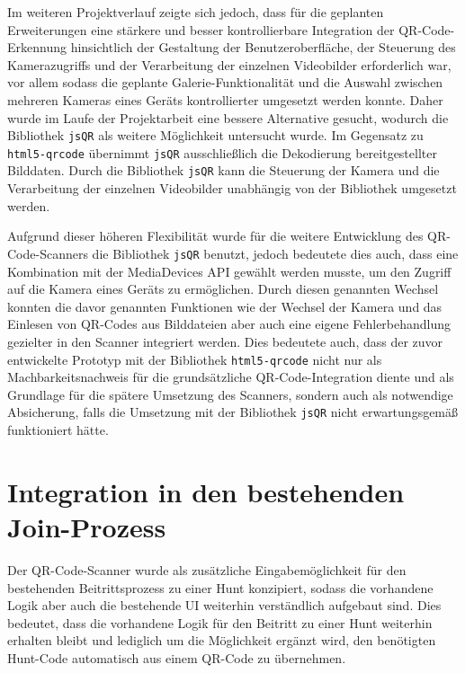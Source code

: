 ﻿\documentclass[oneside]{ausarbeitung}
\begin{document}
Im weiteren Projektverlauf zeigte sich jedoch, dass für die geplanten Erweiterungen eine stärkere und besser kontrollierbare Integration der
QR-Code-Erkennung hinsichtlich der Gestaltung der Benutzeroberfläche, der Steuerung des Kamerazugriffs und der Verarbeitung der einzelnen
Videobilder erforderlich war, vor allem sodass die geplante Galerie-Funktionalität und die Auswahl zwischen mehreren Kameras eines Geräts kontrollierter
umgesetzt werden konnte. Daher wurde im Laufe der Projektarbeit eine bessere Alternative gesucht, wodurch die Bibliothek \texttt{jsQR} als 
weitere Möglichkeit untersucht wurde. Im Gegensatz zu \texttt{html5-qrcode} übernimmt \texttt{jsQR} ausschließlich die Dekodierung bereitgestellter 
Bilddaten. Durch die Bibliothek \texttt{jsQR} kann die Steuerung der Kamera und die Verarbeitung der einzelnen Videobilder unabhängig von der
Bibliothek umgesetzt werden.

Aufgrund dieser höheren Flexibilität wurde für die weitere Entwicklung des QR-Code-Scanners die Bibliothek \texttt{jsQR} benutzt, jedoch bedeutete 
dies auch, dass eine Kombination mit der MediaDevices API gewählt werden musste, um den Zugriff auf die Kamera eines Geräts zu ermöglichen.
Durch diesen genannten Wechsel konnten die davor genannten Funktionen wie der Wechsel der Kamera und das Einlesen von QR-Codes aus Bilddateien 
aber auch eine eigene Fehlerbehandlung gezielter in den Scanner integriert werden. Dies bedeutete auch, dass der zuvor entwickelte Prototyp
mit der Bibliothek \texttt{html5-qrcode} nicht nur als Machbarkeitsnachweis für die grundsätzliche QR-Code-Integration diente und als Grundlage 
für die spätere Umsetzung des Scanners, sondern auch als notwendige Absicherung, falls die Umsetzung mit der Bibliothek \texttt{jsQR} 
nicht erwartungsgemäß funktioniert hätte.


\section{Integration in den bestehenden Join-Prozess}
\label{sec:integration-join}

Der QR-Code-Scanner wurde als zusätzliche Eingabemöglichkeit für den bestehenden Beitrittsprozess zu einer Hunt konzipiert, sodass die vorhandene Logik
aber auch die bestehende UI weiterhin verständlich aufgebaut sind. Dies bedeutet, dass die vorhandene Logik für den Beitritt zu einer Hunt weiterhin 
erhalten bleibt und lediglich um die Möglichkeit ergänzt wird, den benötigten Hunt-Code automatisch aus einem QR-Code zu übernehmen.
\end{document}
